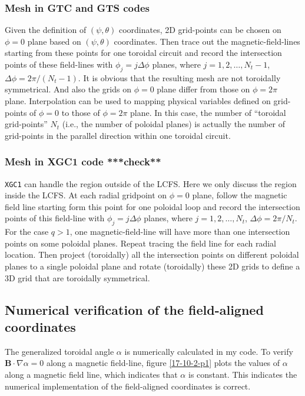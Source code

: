 \documentclass{llncs}
\begin{document}
\subsubsection{Mesh in GTC and GTS codes{\cite{wxwang2006}}}

Given the definition of $(\psi, \theta)$ coordinates, 2D grid-points can be
chosen on $\phi = 0$ plane based on $(\psi, \theta)$ coordinates. Then trace
out the magnetic-field-lines starting from these points for one toroidal
circuit and record the intersection points of these field-lines with $\phi_j =
j \Delta \phi$ planes, where $j = 1, 2, \ldots, N_t - 1$, $\Delta \phi = 2 \pi
/ (N_t - 1)$. It is obvious that the resulting mesh are not toroidally
symmetrical. And also the grids on $\phi = 0$ plane differ from those on $\phi
= 2 \pi$ plane. Interpolation can be used to mapping physical variables
defined on grid-points of $\phi = 0$ to those of $\phi = 2 \pi$ plane. In this
case, the number of ``toroidal grid-points'' $N_t$ (i.e., the number of
poloidal planes) is actually the number of grid-points in the parallel
direction within one toroidal circuit.

\subsubsection{Mesh in XGC1 code ***check**}

{\texttt{XGC1}} can handle the region outside of the LCFS. Here we only
discuss the region inside the LCFS. At each radial gridpoint on $\phi = 0$
plane, follow the magnetic field line starting form this point for one
poloidal loop and record the intersection points of this field-line with
$\phi_j = j \Delta \phi$ planes, where $j = 1, 2, \ldots, N_t$, $\Delta \phi =
2 \pi / N_t$. For the case $q > 1$, one magnetic-field-line will have more
than one intersection points on some poloidal planes. Repeat tracing the field
line for each radial location. Then project (toroidally) all the intersection
points on different poloidal planes to a single poloidal plane and rotate
(toroidally) these 2D grids to define a 3D grid that are toroidally
symmetrical.

\subsection{Numerical verification of the field-aligned coordinates}

The generalized toroidal angle $\alpha$ is numerically calculated in my code.
To verify $\mathbf{B} \cdot \nabla \alpha = 0$ along a magnetic field-line,
figure \ref{17-10-2-p1} plots the values of $\alpha$ along a magnetic field
line, which indicates that $\alpha$ is constant. This indicates the numerical
implementation of the field-aligned coordinates is correct.
\end{document}
